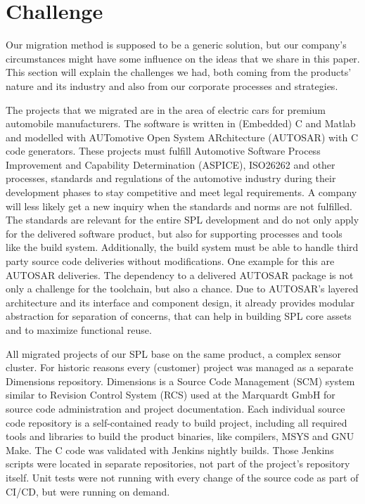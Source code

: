 \section{Challenge}\label{challenge}

Our migration method is supposed to be a generic solution, but our company's
circumstances might have some influence on the ideas that we share in this
paper. This section will explain the challenges we had, both coming from the
products' nature and its industry and also from our corporate processes and
strategies.

The projects that we migrated are in the area of electric cars for premium
automobile manufacturers. The software is written in (Embedded) C and Matlab and
modelled with AUTomotive Open System ARchitecture (AUTOSAR) with C code
generators. These projects must fulfill Automotive Software Process Improvement
and Capability Determination (ASPICE), ISO26262 and other processes, standards
and regulations of the automotive industry during their development phases to
stay competitive and meet legal requirements. A company will less likely get a
new inquiry when the standards and norms are not fulfilled. The standards are
relevant for the entire SPL development and do not only apply for the delivered
software product, but also for supporting processes and tools like the build
system. Additionally, the build system must be able to handle third party source
code deliveries without modifications. One example for this are AUTOSAR
deliveries. The dependency to a delivered AUTOSAR package is not only a
challenge for the toolchain, but also a chance. Due to AUTOSAR's layered
architecture and its interface and component design, it already provides modular
abstraction for separation of concerns, that can help in building SPL core
assets and to maximize functional reuse.

All migrated projects of our SPL base on the same product, a complex sensor
cluster. For historic reasons every (customer) project was managed as a separate
Dimensions repository. Dimensions is a Source Code Management (SCM) system
similar to Revision Control System (RCS) used at the Marquardt GmbH for source
code administration and project documentation. Each individual source code
repository is a self-contained ready to build project, including all required
tools and libraries to build the product binaries, like compilers, MSYS and GNU
Make. The C code was validated with Jenkins nightly builds. Those Jenkins
scripts were located in separate repositories, not part of the project's
repository itself. Unit tests were not running with every change of the source
code as part of CI/CD, but were running on demand.

